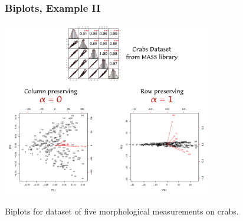 \documentclass{beamer}
\begin{document}


\begin{frame}
  \frametitle{Biplots, Example II}


\centerline{
\includegraphics[height=3in]{fig-crabs}
}

\begin{center}
{\footnotesize Biplots for dataset of five morphological measurements on crabs.}
\end{center}


\end{frame}

\end{document}
